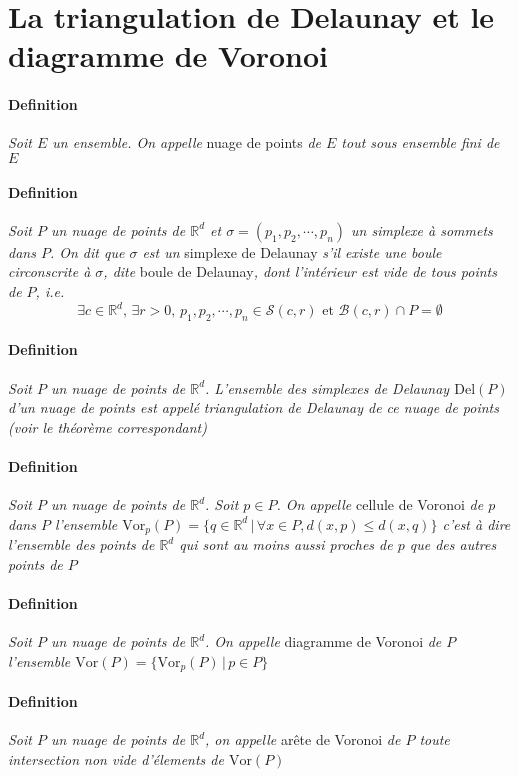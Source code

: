 \documentclass{report}
\newcommand{\R}{\mathbb{R}}
\newcommand{\Vor}{\mathrm{Vor}}
\newcommand{\Del}{\mathrm{Del}}
\begin{document}
\section{La triangulation de Delaunay et le diagramme de Voronoi}
\paragraph{Definition} \textit{Soit $E$ un ensemble. On appelle} nuage de points \textit{de $E$ tout sous ensemble fini de $E$}
\paragraph{Definition} \textit{Soit $P$ un nuage de points de $\R^d$ et $\sigma = (p_1, p_2, \cdots, p_n)$ un simplexe à sommets dans $P$. On dit que $\sigma$ est un} simplexe de Delaunay \textit{s'il existe une boule circonscrite à $\sigma$, dite} boule de Delaunay\textit{, dont l'intérieur est vide de tous points de $P$, i.e.}
$$\exists c\in \R^d, \, \exists r > 0, \, p_1, p_2, \cdots, p_n \in \mathcal S(c, r) \text{ et }\mathcal B(c, r)\cap P = \emptyset$$
\paragraph{Definition} \textit{Soit $P$ un nuage de points de $\R^d$. L'ensemble des simplexes de Delaunay $\Del(P)$ d'un nuage de points est appelé} \textit{triangulation de Delaunay de ce nuage de points (voir le théorème correspondant)}
\paragraph{Definition} \textit{Soit $P$ un nuage de points de $\R^d$. Soit $p\in P$. On appelle} cellule de Voronoi \textit{de $p$ dans $P$ l'ensemble $\Vor_p(P) = \{q\in \R^d\,|\,\forall x\in P, d(x, p) \leq d(x, q)\}$ c'est à dire l'ensemble des points de $\R^d$ qui sont au moins aussi proches de $p$ que des autres points de $P$}
\paragraph{Definition} \textit{Soit $P$ un nuage de points de $\R^d$. On appelle} diagramme de Voronoi \textit{de $P$ l'ensemble $\Vor(P) = \{\Vor_p(P)\,|\,p\in P\}$}
\paragraph{Definition} \textit{Soit $P$ un nuage de points de $\R^d$, on appelle} arête de Voronoi \textit{de $P$ toute intersection non vide d'élements de $\Vor(P)$}
\end{document}
